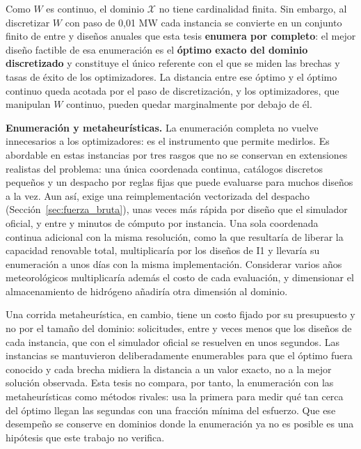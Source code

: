\TablaInstanciasAuto

Como $W$ es continuo, el dominio $\mathcal{X}$ no tiene cardinalidad finita. Sin embargo, al discretizar $W$ con paso de 0,01 MW cada instancia se convierte en un conjunto finito de entre \BFEDesigns{} y \BFCDesigns{} diseños anuales que esta tesis \textbf{enumera por completo}: el mejor diseño factible de esa enumeración es el \textbf{óptimo exacto del dominio discretizado} y constituye el único referente con el que se miden las brechas y tasas de éxito de los optimizadores. La distancia entre ese óptimo y el óptimo continuo queda acotada por el paso de discretización, y los optimizadores, que manipulan $W$ continuo, pueden quedar marginalmente por debajo de él.

\textbf{Enumeración y metaheurísticas.} La enumeración completa no vuelve innecesarios a los optimizadores: es el instrumento que permite medirlos. Es abordable en estas instancias por tres rasgos que no se conservan en extensiones realistas del problema: una única coordenada continua, catálogos discretos pequeños y un despacho por reglas fijas que puede evaluarse para muchos diseños a la vez. Aun así, exige una reimplementación vectorizada del despacho (Sección~\ref{sec:fuerza_bruta}), unas \VectorSpeedup{} veces más rápida por diseño que el simulador oficial, y entre \BruteForceMinutesMin{} y \BruteForceMinutesMax{} minutos de cómputo por instancia. Una sola coordenada continua adicional con la misma resolución, como la que resultaría de liberar la capacidad renovable total, multiplicaría por \SecondCoordFactor{} los diseños de I1 y llevaría su enumeración a unos \SecondCoordDays{} días con la misma implementación. Considerar varios años meteorológicos multiplicaría además el costo de cada evaluación, y dimensionar el almacenamiento de hidrógeno añadiría otra dimensión al dominio.

Una corrida metaheurística, en cambio, tiene un costo fijado por su presupuesto y no por el tamaño del dominio: \RequestsPerRun{} solicitudes, entre \DesignsPerBudgetMin{} y \DesignsPerBudgetMax{} veces menos que los diseños de cada instancia, que con el simulador oficial se resuelven en unos \RunSecondsMedian{} segundos. Las instancias se mantuvieron deliberadamente enumerables para que el óptimo fuera conocido y cada brecha midiera la distancia a un valor exacto, no a la mejor solución observada. Esta tesis no compara, por tanto, la enumeración con las metaheurísticas como métodos rivales: usa la primera para medir qué tan cerca del óptimo llegan las segundas con una fracción mínima del esfuerzo. Que ese desempeño se conserve en dominios donde la enumeración ya no es posible es una hipótesis que este trabajo no verifica.

